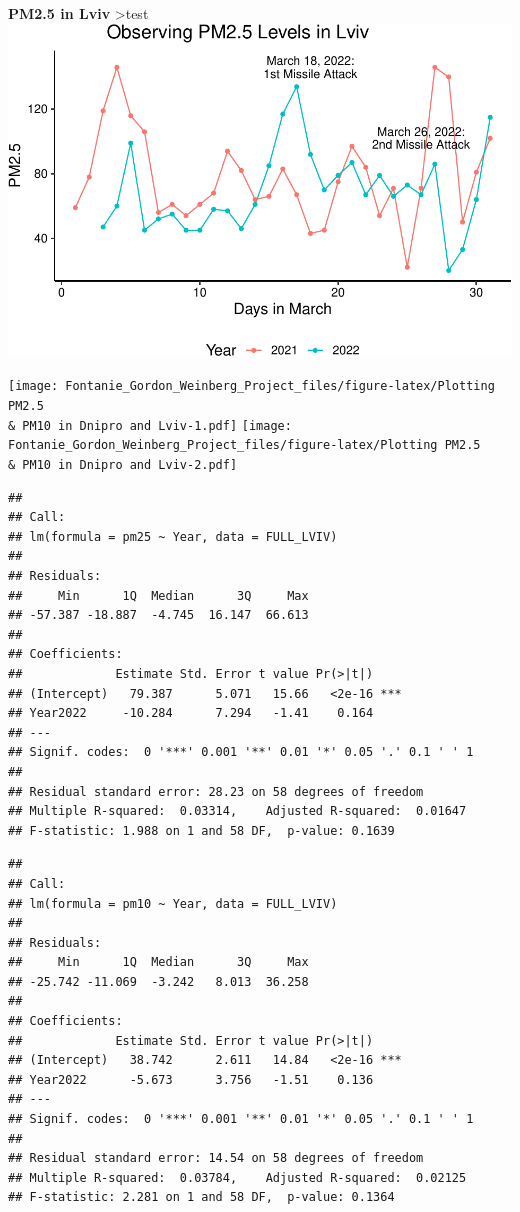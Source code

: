 \documentclass[
  12pt,
]{article}
\begin{document}
\textbf{PM2.5 in Lviv} \textgreater test
\includegraphics{Fontanie_Gordon_Weinberg_Project_files/figure-latex/plotting PM25 in Lviv-1.pdf}

\texttt{[image: Fontanie\_Gordon\_Weinberg\_Project\_files/figure-latex/Plotting PM2.5 \\\& PM10 in Dnipro and Lviv-1.pdf]}
\texttt{[image: Fontanie\_Gordon\_Weinberg\_Project\_files/figure-latex/Plotting PM2.5 \\\& PM10 in Dnipro and Lviv-2.pdf]}

\begin{verbatim}
## 
## Call:
## lm(formula = pm25 ~ Year, data = FULL_LVIV)
## 
## Residuals:
##     Min      1Q  Median      3Q     Max 
## -57.387 -18.887  -4.745  16.147  66.613 
## 
## Coefficients:
##             Estimate Std. Error t value Pr(>|t|)    
## (Intercept)   79.387      5.071   15.66   <2e-16 ***
## Year2022     -10.284      7.294   -1.41    0.164    
## ---
## Signif. codes:  0 '***' 0.001 '**' 0.01 '*' 0.05 '.' 0.1 ' ' 1
## 
## Residual standard error: 28.23 on 58 degrees of freedom
## Multiple R-squared:  0.03314,    Adjusted R-squared:  0.01647 
## F-statistic: 1.988 on 1 and 58 DF,  p-value: 0.1639
\end{verbatim}

\begin{verbatim}
## 
## Call:
## lm(formula = pm10 ~ Year, data = FULL_LVIV)
## 
## Residuals:
##     Min      1Q  Median      3Q     Max 
## -25.742 -11.069  -3.242   8.013  36.258 
## 
## Coefficients:
##             Estimate Std. Error t value Pr(>|t|)    
## (Intercept)   38.742      2.611   14.84   <2e-16 ***
## Year2022      -5.673      3.756   -1.51    0.136    
## ---
## Signif. codes:  0 '***' 0.001 '**' 0.01 '*' 0.05 '.' 0.1 ' ' 1
## 
## Residual standard error: 14.54 on 58 degrees of freedom
## Multiple R-squared:  0.03784,    Adjusted R-squared:  0.02125 
## F-statistic: 2.281 on 1 and 58 DF,  p-value: 0.1364
\end{verbatim}
\end{document}
